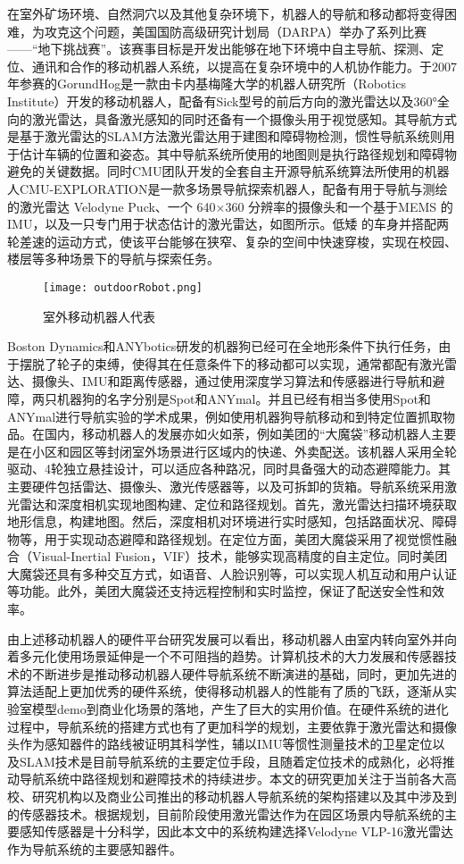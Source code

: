 在室外矿场环境、自然洞穴以及其他复杂环境下，机器人的导航和移动都将变得困难，为攻克这个问题，美国国防高级研究计划局（DARPA）举办了系列比赛——“地下挑战赛”。该赛事目标是开发出能够在地下环境中自主导航、探测、定位、通讯和合作的移动机器人系统，以提高在复杂环境中的人机协作能力。于2007年参赛的GorundHog\cite{nuchter20046d}是一款由卡内基梅隆大学的机器人研究所（Robotics Institute）开发的移动机器人，配备有Sick型号的前后方向的激光雷达以及360°全向的激光雷达，具备激光感知的同时还备有一个摄像头用于视觉感知。其导航方式是基于激光雷达的SLAM方法激光雷达用于建图和障碍物检测，惯性导航系统则用于估计车辆的位置和姿态。其中导航系统所使用的地图则是执行路径规划和障碍物避免的关键数据。同时CMU团队开发的全套自主开源导航系统算法所使用的机器人CMU-EXPLORATION\cite{cao2022autonomous}是一款多场景导航探索机器人，配备有用于导航与测绘的激光雷达 Velodyne Puck、一个 640×360 分辨率的摄像头和一个基于MEMS 的 IMU，以及一只专门用于状态估计的激光雷达，如图所示。低矮
的车身并搭配两轮差速的运动方式，使该平台能够在狭窄、复杂的空间中快速穿梭，实现在校园、楼层等多种场景下的导航与探索任务\cite{zhu2021dsvp,cao2021tare}。
\begin{figure}[ht]
  \centering
  \texttt{[image: outdoorRobot.png]}
  \caption{室外移动机器人代表}
\end{figure}
Boston Dynamics和ANYbotics研发的机器狗已经可在全地形条件下执行任务，由于摆脱了轮子的束缚，使得其在任意条件下的移动都可以实现，通常都配有激光雷达、摄像头、IMU和距离传感器，通过使用深度学习算法和传感器进行导航和避障，两只机器狗的名字分别是Spot和ANYmal\cite{hutter2016anymal}。并且已经有相当多使用Spot和ANYmal进行导航实验的学术成果，例如使用机器狗导航移动和到特定位置抓取物品\cite{zimmermann2021go}。在国内，移动机器人的发展亦如火如荼，例如美团的“大魔袋”移动机器人主要是在小区和园区等封闭室外场景进行区域内的快递、外卖配送。该机器人采用全轮驱动、4轮独立悬挂设计，可以适应各种路况，同时具备强大的动态避障能力。其主要硬件包括雷达、摄像头、激光传感器等，以及可拆卸的货箱。导航系统采用激光雷达和深度相机实现地图构建、定位和路径规划。首先，激光雷达扫描环境获取地形信息，构建地图。然后，深度相机对环境进行实时感知，包括路面状况、障碍物等，用于实现动态避障和路径规划\cite{zhang2022hybrid}。在定位方面，美团大魔袋采用了视觉惯性融合（Visual-Inertial Fusion，VIF）技术，能够实现高精度的自主定位。同时美团大魔袋还具有多种交互方式，如语音、人脸识别等，可以实现人机互动和用户认证等功能。此外，美团大魔袋还支持远程控制和实时监控，保证了配送安全性和效率。

由上述移动机器人的硬件平台研究发展可以看出，移动机器人由室内转向室外并向着多元化使用场景延伸是一个不可阻挡的趋势。计算机技术的大力发展和传感器技术的不断进步是推动移动机器人硬件导航系统不断演进的基础，同时，更加先进的算法适配上更加优秀的硬件系统，使得移动机器人的性能有了质的飞跃，逐渐从实验室模型demo到商业化场景的落地，产生了巨大的实用价值。在硬件系统的进化过程中，导航系统的搭建方式也有了更加科学的规划，主要依靠于激光雷达和摄像头作为感知器件的路线被证明其科学性，辅以IMU等惯性测量技术的卫星定位以及SLAM技术是目前导航系统的主要定位手段，且随着定位技术的成熟化，必将推动导航系统中路径规划和避障技术的持续进步。本文的研究更加关注于当前各大高校、研究机构以及商业公司推出的移动机器人导航系统的架构搭建以及其中涉及到的传感器技术。根据规划，目前阶段使用激光雷达作为在园区场景内导航系统的主要感知传感器是十分科学，因此本文中的系统构建选择Velodyne VLP-16激光雷达作为导航系统的主要感知器件。

